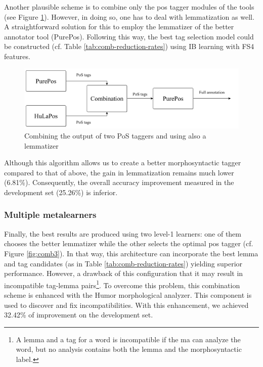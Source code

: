 Another plausible scheme is to combine only the \acrshort{pos} tagger modules of the tools (see Figure \ref{fig:comb2}).
However, in doing so, one has to deal with lemmatization as well.
A straightforward solution for this to employ the lemmatizer of the better annotator tool (PurePos).
Following this way, the best tag selection model could be constructed (cf.
Table \ref{tab:comb-reduction-rates}) using IB learning with FS4 features.

\begin{figure}[H]
  \centering
  \includegraphics[scale=0.2]{MorphTagging/comb2.png} 
  \caption{Combining the output of two PoS taggers and using also a lemmatizer}
  \label{fig:comb2}
\end{figure}

Although this algorithm allows us to create a better morphosyntactic tagger compared to that of above, the gain in lemmatization remains much lower (6.81\%).
Consequently, the overall accuracy improvement measured in the development set (25.26\%) is inferior.

\subsubsection{Multiple metalearners}

Finally, the best results are produced using two level-1 learners: one of them chooses the better lemmatizer while the other selects the optimal \acrshort{pos} tagger (cf. Figure \ref{fig:comb3}).
In that  way, this architecture can incorporate the best lemma and tag candidates (as in Table \ref{tab:comb-reduction-rates}) yielding superior performance.
However, a drawback of this configuration that it may result in incompatible tag-lemma pairs\footnote{A lemma and a tag for a word is incompatible if the \acrshort{ma} can analyze the word, but no analysis contains both the lemma and the morphosyntactic label.}.
To overcome this problem, this combination scheme is enhanced with the Humor morphological analyzer.
This component is used to discover and fix incompatibilities.
With this enhancement, we achieved  32.42\% of improvement on the development set.

